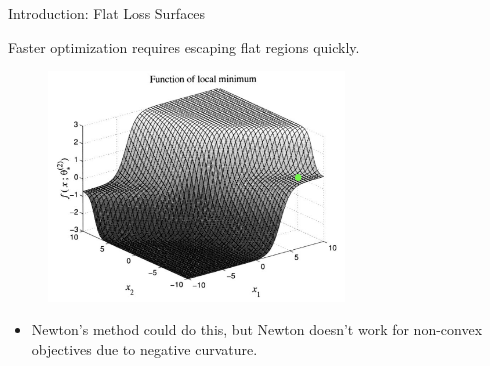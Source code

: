 \documentclass[usenames,dvipsnames,mathserif,notheorems]{beamer}
\newcommand{\bad}[1]{\textcolor{bad}{#1}}
\newcommand{\good}[1]{\textcolor{good}{#1}}
\begin{document}
\begin{frame}{Introduction: Flat Loss Surfaces}

    Faster optimization requires \good{escaping flat regions} quickly.

    \pause

    \begin{figure}[]
        \centering
        \includegraphics[width=0.7\textwidth]{assets/loss_surface_plain.png}
    \end{figure}

    \pause

    \begin{itemize}
        \item Newton's method could do this, but Newton doesn't work
              for non-convex objectives due to \bad{negative curvature}.
    \end{itemize}


\end{frame}
\end{document}
